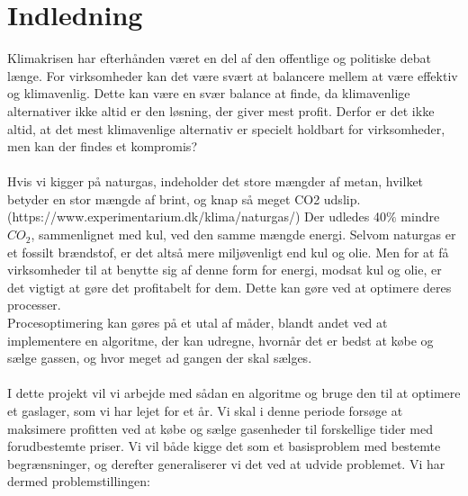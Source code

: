\chapter{Indledning}
Klimakrisen har efterhånden været en del af den offentlige og politiske debat længe. For virksomheder kan det være svært at balancere mellem at være effektiv og klimavenlig. Dette kan være en svær balance at finde, da klimavenlige alternativer ikke altid er den løsning, der giver mest profit. Derfor er det ikke altid, at det mest klimavenlige alternativ er specielt holdbart for virksomheder, men kan der findes et kompromis? \\ \\Hvis vi kigger på naturgas, indeholder det store mængder af metan, hvilket betyder en stor mængde af brint, og knap så meget CO2 udslip. (https://www.experimentarium.dk/klima/naturgas/) Der udledes 40$\%$ mindre $CO_{2}$, sammenlignet med kul, ved den samme mængde energi. Selvom naturgas er et fossilt brændstof, er det altså mere miljøvenligt end kul og olie. Men for at få virksomheder til at benytte sig af denne form for energi, modsat kul og olie, er det vigtigt at gøre det profitabelt for dem. Dette kan gøre ved at optimere deres processer. \\ Procesoptimering kan gøres på et utal af måder, blandt andet ved at implementere en algoritme, der kan udregne, hvornår det er bedst at købe og sælge gassen, og hvor meget ad gangen der skal sælges. \\
\\I dette projekt vil vi arbejde med sådan en algoritme og bruge den til at optimere et gaslager, som vi har lejet for et år. Vi skal i denne periode forsøge at maksimere profitten ved at købe og sælge gasenheder til forskellige tider med forudbestemte priser. Vi vil både kigge det som et basisproblem med bestemte begrænsninger, og derefter generaliserer vi det ved at udvide problemet. Vi har dermed problemstillingen: 

